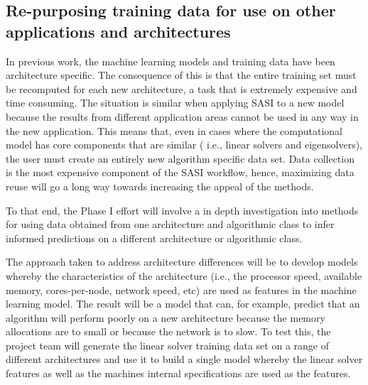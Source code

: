 \subsection{ Re-purposing training data for use on other applications and architectures }
\label{sec:reuse}
In previous work, the machine learning models and training data have been architecture specific. The consequence of this is that the entire training set must be recomputed for each new architecture, a task that is extremely expensive and time consuming. The situation is similar when applying SASI to a new model because the results from different application areas cannot be used in any way in the new application. This means that, even in cases where the computational model has core components that are similar ( i.e., linear solvers and eigensolvers), the user must create an entirely new algorithm specific data set. Data collection is the most expensive component of the SASI workflow, hence, maximizing data reuse will go a long way towards increasing the appeal of the methods. 

To that end, the Phase I effort will involve a in depth investigation into methods for using data obtained from one architecture and algorithmic class to infer informed predictions on a different architecture or algorithmic class.  

The approach taken to address architecture differences will be to develop models whereby the characteristics of the architecture (i.e., the processor speed, available memory, cores-per-node, network speed, etc) are used as features in the machine learning model. The result will be a model that can, for example, predict that an algorithm will perform poorly on a new architecture because the memory allocations are to small or because the network is to slow. To test this, the project team will generate the linear solver training data set on a range of different architectures and use it to build a single model whereby the linear solver features as well as the machines internal specifications are used as the features. 

